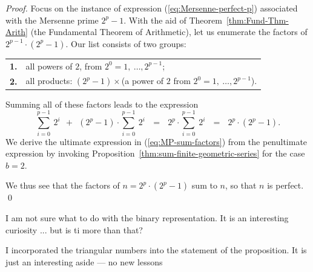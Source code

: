 \begin{proof}
Focus on the instance of expression (\ref{eq:Mersenne-perfect-p})
associated with the Mersenne prime $2^p-1$.  With the aid of
Theorem~\ref{thm:Fund-Thm-Arith} (the Fundamental Theorem of
Arithmetic), let us enumerate the factors of $2^{p-1} \cdot (2^p-1)$.
Our list consists of two groups:

\begin{tabular}{cl}
{\bf 1.} &
all powers of $2$, from $2^0 =1, \ \ldots, 2^{p-1}$; \\
{\bf 2.} &
all products: $(2^p-1) \times$(a power of $2$ from $2^0 =1, \ \ldots,
2^{p-1}$).
\end{tabular}

\noindent
Summing all of these factors leads to the expression
\begin{equation}
\label{eq:MP-sum-factors}
\sum_{i=0}^{p-1} \ 2^i \ \ + \ \ (2^p-1) \cdot \sum_{i=0}^{p-1} \ 2^i
 \ \ \ = \ \ \  2^p \cdot \sum_{i=0}^{p-1} \ 2^i
 \ \ \ = \ \ \ 2^p \cdot (2^p -1).
\end{equation}
We derive the ultimate expression in (\ref{eq:MP-sum-factors}) from
the penultimate expression by invoking
Proposition~\ref{thm:sum-finite-geometric-series} for the case $b=2$.

We thus see that the factors of $n = 2^p \cdot (2^p -1)$ sum to $n$,
so that $n$ is perfect.
\qed
\end{proof}



%

{\Arny I am not sure what to do with the binary representation.  It is
  an interesting curiosity ... but is ti more than that?}




{\Arny I incorporated the triangular numbers into the statement of the
  proposition.  It is just an interesting aside --- no new lessons}


